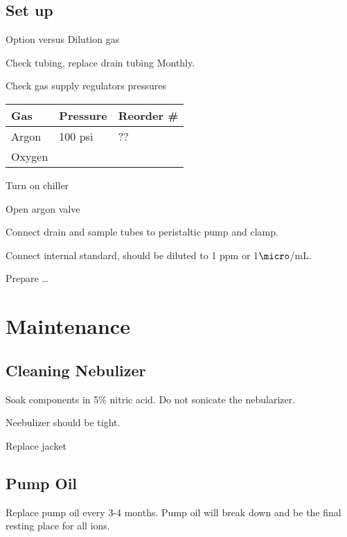 \documentclass[12pt]{../SOP3_beta}
\begin{document}
\subsection{Set up}

\NP Option versus Dilution gas

\NP Check tubing, replace drain tubing Monthly.

\NP Check gas supply regulators pressures

\begin{table}[h]
\begin{tabular}{lll} \hline
Gas   &     Pressure    & Reorder \# \\ \hline\hline
Argon &       100 psi   & ??          \\
Oxygen&                 & \\ 

\end{tabular}
\end{table}

\NP Turn on chiller

\NP Open argon valve

\NP Connect drain and sample tubes to peristaltic pump and clamp.

\NP Connect internal standard, should be diluted to 1 ppm or 1$\micro$/mL. 

\NP 

\NP Prepare \dots

\NP

\section{Maintenance}

\subsection{Cleaning Nebulizer}

\NP Soak components in 5\% nitric acid. Do not sonicate the nebularizer.

\NP Neebulizer should be tight.

\NP Replace jacket

\subsection{Pump Oil}

\NP Replace pump oil every 3-4 months. Pump oil will break down and be the final resting place for all ions.

\NP
\end{document}

